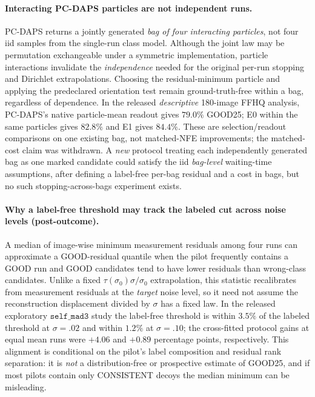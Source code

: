 \paragraph{Interacting PC-DAPS particles are not independent runs.}
PC-DAPS returns a jointly generated
\emph{bag of four interacting particles}, not
four iid samples from the single-run class model.
Although the joint law may be permutation
exchangeable under a symmetric implementation,
particle interactions invalidate the
\emph{independence} needed for the original
per-run stopping and Dirichlet extrapolations.
Choosing the residual-minimum particle and applying
the predeclared orientation test remain
ground-truth-free within a bag, regardless of
dependence. In the released \emph{descriptive}
180-image FFHQ analysis, PC-DAPS's native
particle-mean readout gives $79.0\%$ GOOD25;
E0 within the same particles gives $82.8\%$
and E1 gives $84.4\%$. These are
selection/readout comparisons on one existing
bag, not matched-NFE improvements; the
matched-cost claim was withdrawn.
A \emph{new} protocol treating each independently
generated bag as one marked candidate could
satisfy the iid \emph{bag-level} waiting-time
assumptions, after defining a label-free
per-bag residual and a cost in bags, but
no such stopping-across-bags experiment exists.


\paragraph{Why a label-free threshold may track the labeled cut across noise levels (post-outcome).}
A median of image-wise minimum measurement residuals among four
runs can approximate a GOOD-residual quantile when the pilot
frequently contains a GOOD run and GOOD candidates tend to have
lower residuals than wrong-class candidates. Unlike a fixed
$\tau(\sigma_0)\sigma/\sigma_0$ extrapolation, this statistic
recalibrates from measurement residuals at the \emph{target}
noise level, so it need not assume the reconstruction
displacement divided by $\sigma$ has a fixed law.
In the released exploratory $\texttt{self\_mad3}$ study the
label-free threshold is within $3.5\%$ of the labeled threshold
at $\sigma=.02$ and within $1.2\%$ at $\sigma=.10$;
the cross-fitted protocol gains at equal mean runs were $+4.06$
and $+0.89$ percentage points, respectively.
This alignment is conditional on the pilot's label
composition and residual rank separation: it is \emph{not}
a distribution-free or prospective estimate of GOOD25,
and if most pilots contain only CONSISTENT decoys the
median minimum can be misleading.
